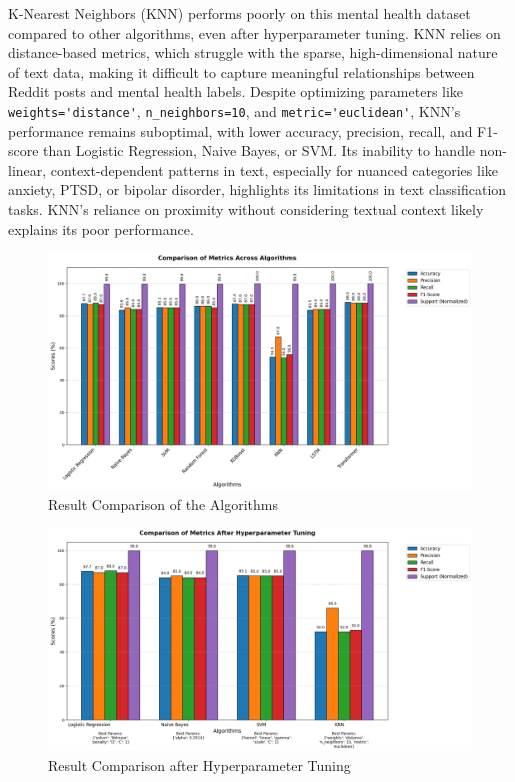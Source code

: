 \vspace{0.5em}

\noindent
K-Nearest Neighbors (KNN) performs poorly on this mental health dataset compared to other algorithms, even after hyperparameter tuning. KNN relies on distance-based metrics, which struggle with the sparse, high-dimensional nature of text data, making it difficult to capture meaningful relationships between Reddit posts and mental health labels. Despite optimizing parameters like \verb|weights='distance'|, \verb|n_neighbors=10|, and \verb|metric='euclidean'|, KNN's performance remains suboptimal, with lower accuracy, precision, recall, and F1-score than Logistic Regression, Naive Bayes, or SVM. Its inability to handle non-linear, context-dependent patterns in text, especially for nuanced categories like anxiety, PTSD, or bipolar disorder, highlights its limitations in text classification tasks. KNN's reliance on proximity without considering textual context likely explains its poor performance.

\pagebreak

\begin{figure}[h!]  
    \centering
    \includegraphics[width=1.0\textwidth]{Images/ML GRAPH 1.png}  
    \caption{Result Comparison of the Algorithms}
    \label{dfdl145}  %
\end{figure}

\begin{figure}[h!]  
    \centering
    \includegraphics[width=1.0\textwidth]{Images/ML GRAPH 2 HT.png}  
    \caption{Result Comparison after Hyperparameter Tuning}
    \label{dfdl123}  %
\end{figure}


